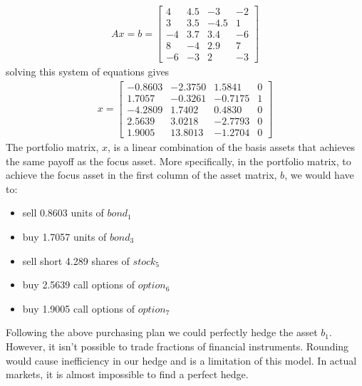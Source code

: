 \documentclass[a4paper,11pt]{report}
\begin{document}
\begin{multicols}{2}
\begin{align*}
	Ax=b=
	\left[\begin{array}{ccccc}
		4 & 4.5 & -3 & -2\\ 
		3 & 3.5 & -4.5 & 1\\
		-4 & 3.7 & 3.4 & -6\\
		8 & -4 & 2.9 & 7\\
		-6 & -3  & 2 & -3
	\end{array}\right]
\end{align*}
solving this system of equations gives
\begin{align*}
	x=
	\left[\begin{array}{ccccc}
		-0.8603 & -2.3750 & 1.5841 & 0\\
		1.7057 & -0.3261 & -0.7175 & 1\\
 		-4.2809 &   1.7402  &  0.4830 & 0\\
		2.5639  &  3.0218  & -2.7793  &  0\\
		1.9005 &  13.8013 &  -1.2704  &  0
	\end{array}\right]
\end{align*}
The portfolio matrix, $x$, is a linear combination of the basis assets that achieves the same payoff as the focus asset. More specifically, in the portfolio matrix, to achieve the focus asset in the first column of the asset matrix, $b$, we would have to:
\begin{itemize}
	\item sell 0.8603 units of $bond_1$ 
	\item buy 1.7057 units of $bond_3$
	\item sell short 4.289 shares of $stock_5$ 
	\item buy 2.5639 call options of $option_6$
	\item buy 1.9005 call options of $option_7$
\end{itemize}

Following the above purchasing plan we could perfectly hedge the asset $b_1$. 
However, it isn't possible to trade fractions of financial instruments. 
Rounding would cause inefficiency in our hedge and is a limitation of this model. 
In actual markets, it is almost impossible to find a perfect hedge. 


\end{multicols}
\end{document}
